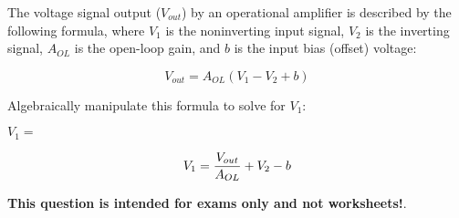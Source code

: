 

The voltage signal output ($V_{out}$) by an operational amplifier is described by the following formula, where $V_1$ is the noninverting input signal, $V_2$ is the inverting signal, $A_{OL}$ is the open-loop gain, and $b$ is the input bias (offset) voltage:

$$V_{out} = A_{OL} (V_1 - V_2 + b)$$

Algebraically manipulate this formula to solve for $V_1$:

\vskip 20pt

$V_1 = $







$$V_1 = {V_{out} \over A_{OL}} + V_2 - b$$







{\bf This question is intended for exams only and not worksheets!}.



